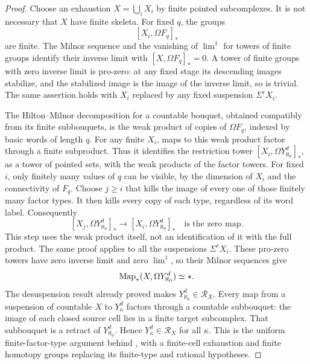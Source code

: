\begin{proof}
Choose an exhaustion $X=\bigcup_i X_i$ by finite pointed
subcomplexes. It is not necessary that $X$ have finite skeleta.
For fixed $q$, the groups
\[
                 [X_i,\Omega F_q]_*
\]
are finite. The Milnor sequence and the vanishing of $\lim^1$
for towers of finite groups identify their inverse limit with
$[X,\Omega F_q]_*=0$. A tower of finite groups with zero
inverse limit is pro-zero: at any fixed stage its descending
images stabilize, and the stabilized image is the image of
the inverse limit, so is trivial. The same assertion holds
with $X_i$ replaced by any fixed suspension $\Sigma^rX_i$.

The Hilton--Milnor decomposition for a countable bouquet,
obtained compatibly from its finite subbouquets, is the weak
product of copies of $\Omega F_q$, indexed by basic words of
length $q$. For any finite $X_i$, maps to this weak product
factor through a finite subproduct. Thus it identifies the
restriction tower $[X_i,\Omega Y_{\aleph_0}^d]_*$, as a tower
of pointed sets, with the weak products of the factor towers.
For fixed $i$, only finitely many values of $q$ can be visible,
by the dimension of $X_i$ and the connectivity of $F_q$.
Choose $j\geq i$ that kills the image of every one of those
finitely many factor types. It then kills every copy of each
type, regardless of its word label. Consequently
\[
 [X_j,\Omega Y_{\aleph_0}^d]_*\longrightarrow
 [X_i,\Omega Y_{\aleph_0}^d]_*
             \quad\text{is the zero map}.
 \tag{D.3.4.4}
\]
This step uses the weak product itself, not an identification
of it with the full product. The same proof applies to all
the suspensions $\Sigma^rX_i$. These pro-zero towers have
zero inverse limit and zero $\lim^1$, so their Milnor
sequences give
\[
             \operatorname{Map}_*(X,\Omega Y_{\aleph_0}^d)\simeq *.
\]
The desuspension result already proved makes
$Y_{\aleph_0}^d\in\mathcal R_X$. Every map from a suspension
of countable $X$ to $Y_\kappa^d$ factors through a countable
subbouquet: the image of each closed source cell lies in a
finite target subcomplex. That subbouquet is a retract of
$Y_{\aleph_0}^d$. Hence $Y_\kappa^d\in\mathcal R_X$ for all
$\kappa$. This is the uniform finite-factor-type argument
behind \cite[Proposition~6]{I_Strom2012}, with a finite-cell
exhaustion and finite homotopy groups replacing its
finite-type and rational hypotheses.


\end{proof}

